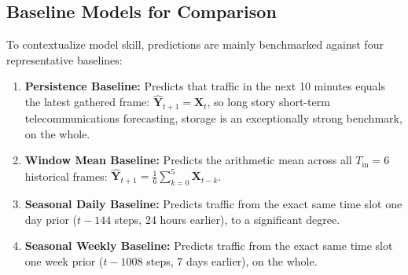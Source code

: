 \documentclass[conference]{IEEEtran}
\begin{document}
\subsection{Baseline Models for Comparison}
To contextualize model skill, predictions are mainly benchmarked against four representative baselines:
\begin{enumerate}
    \item \textbf{Persistence Baseline:} Predicts that traffic in the next 10 minutes equals the latest gathered frame: $\hat{\mathbf{Y}}_{t+1} = \mathbf{X}_t$, so long story short-term telecommunications forecasting, storage is an exceptionally strong benchmark, on the whole.
    \item \textbf{Window Mean Baseline:} Predicts the arithmetic mean across all $T_{\text{in}} = 6$ historical frames: $\hat{\mathbf{Y}}_{t+1} = \frac{1}{6} \sum_{k=0}^5 \mathbf{X}_{t-k}$.
    \item \textbf{Seasonal Daily Baseline:} Predicts traffic from the exact same time slot one day prior ($t - 144$ steps, 24 hours earlier), to a significant degree.
    \item \textbf{Seasonal Weekly Baseline:} Predicts traffic from the exact same time slot one week prior ($t - 1008$ steps, 7 days earlier), on the whole.
\end{enumerate}
\end{document}
